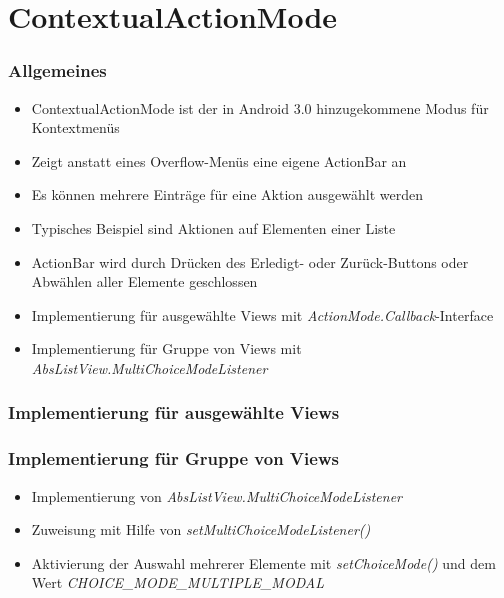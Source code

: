\section{ContextualActionMode}
\begin{frame}
   \frametitle{Allgemeines}
   \begin{itemize}
      \item ContextualActionMode ist der in Android 3.0 hinzugekommene Modus für Kontextmenüs
      \item Zeigt anstatt eines Overflow-Menüs eine eigene ActionBar an
      \item Es können mehrere Einträge für eine Aktion ausgewählt werden
      \item Typisches Beispiel sind Aktionen auf Elementen einer Liste
      \item ActionBar wird durch Drücken des Erledigt- oder 
         Zurück-Buttons oder Abwählen aller Elemente geschlossen
      \item Implementierung für ausgewählte Views mit \emph{ActionMode.Callback}-Interface
      \item Implementierung für Gruppe von Views mit \emph{AbsListView.MultiChoiceModeListener}
   \end{itemize}
\end{frame}

\begin{frame}
   \frametitle{Implementierung für ausgewählte Views}
   

   
\end{frame}

\begin{frame}
   \frametitle{Implementierung für Gruppe von Views}
   \begin{itemize}
      \item Implementierung von \emph{AbsListView.MultiChoiceModeListener}
      \item Zuweisung mit Hilfe von \emph{setMultiChoiceModeListener()}
      \item Aktivierung der Auswahl mehrerer Elemente mit \emph{setChoiceMode()} 
         und dem Wert \emph{CHOICE\_MODE\_MULTIPLE\_MODAL}
   \end{itemize}
\end{frame}

